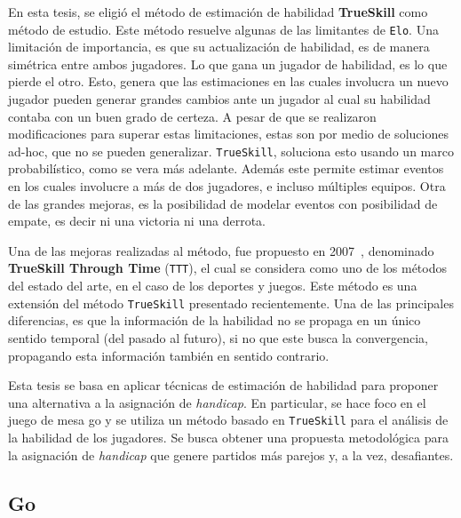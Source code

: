 \documentclass[11pt,twoside,spanish]{report} %
\begin{document}
En esta tesis, se eligi\'o el m\'etodo de estimaci\'on de habilidad \textbf{TrueSkill} como m\'etodo de estudio.
Este m\'etodo resuelve algunas de las limitantes de \texttt{Elo}.
Una limitaci\'on de importancia, es que su actualizaci\'on de habilidad, es de manera sim\'etrica entre ambos jugadores.
Lo que gana un jugador de habilidad, es lo que pierde el otro.
Esto, genera que las estimaciones en las cuales involucra un nuevo jugador pueden generar grandes cambios ante un jugador al cual su habilidad contaba con un buen grado de certeza.
A pesar de que se realizaron modificaciones para superar estas limitaciones, estas son por medio de soluciones ad-hoc, que no se pueden generalizar.
\texttt{TrueSkill}, soluciona esto usando un marco probabil\'istico, como se vera m\'as adelante.
Adem\'as este permite estimar eventos en los cuales involucre a m\'as de dos jugadores, e incluso m\'ultiples equipos.
Otra de las grandes mejoras, es la posibilidad de modelar eventos con posibilidad de empate, es decir ni una victoria ni una derrota.


Una de las mejoras realizadas al m\'etodo, fue propuesto en 2007~\cite{Dangauthier2007}, denominado \textbf{TrueSkill Through Time} (\texttt{TTT}), el cual se considera como uno de los m\'etodos del estado del arte, en el caso de los deportes y juegos.
Este m\'etodo es una extensi\'on del m\'etodo \texttt{TrueSkill} presentado recientemente.
Una de las principales diferencias, es que la informaci\'on de la habilidad no se propaga en un \'unico sentido temporal (del pasado al futuro), si no que este busca la convergencia, propagando esta informaci\'on tambi\'en en sentido contrario. 

\vspace{0.3cm}
\begin{mdframed}[backgroundcolor=frenchblue!20]
	Esta tesis se basa en aplicar t\'ecnicas de estimaci\'on de habilidad para proponer una alternativa a la asignaci\'on de \emph{handicap}. 
	En particular, se hace foco en el juego de mesa go y se utiliza un m\'etodo basado en \texttt{TrueSkill} para el an\'alisis de la habilidad de los jugadores.
	Se busca obtener una propuesta metodol\'ogica para la asignaci\'on de \emph{handicap} que genere partidos m\'as parejos y, a la vez, desafiantes.
\end{mdframed}


\subsection{Go}
\end{document}
